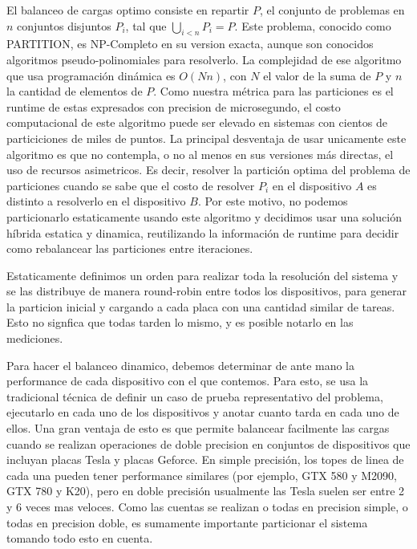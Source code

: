 El balanceo de cargas optimo consiste en repartir $P$, el conjunto de problemas en
$n$ conjuntos disjuntos $P_i$, tal que $\bigcup_{i<n} P_i = P$. Este problema, conocido como PARTITION,
es NP-Completo en su version exacta, aunque son conocidos algoritmos pseudo-polinomiales para resolverlo.
La complejidad de ese algoritmo que usa programaci\'on din\'amica es $O(Nn)$, con $N$ el valor
de la suma de $P$ y $n$ la cantidad de elementos de $P$. Como nuestra m\'etrica para las
particiones es el runtime de estas expresados con precision de microsegundo, el costo computacional
de este algoritmo puede ser elevado en sistemas con cientos de particiciones de miles de puntos.
La principal desventaja de usar unicamente este algoritmo es que no contempla, o no al menos
en sus versiones m\'as directas, el uso de recursos asimetricos. Es decir, resolver la partici\'on
optima del problema de particiones cuando se sabe que el costo de resolver $P_i$ en el dispositivo
$A$ es distinto a resolverlo en el dispositivo $B$. Por este motivo, no podemos particionarlo estaticamente
usando este algoritmo y decidimos usar una soluci\'on h\'ibrida estatica y dinamica, reutilizando
la informaci\'on de runtime para decidir como rebalancear las particiones entre iteraciones.

Estaticamente definimos un orden para realizar toda la resoluci\'on del sistema y
se las distribuye de manera round-robin entre todos los dispositivos, para generar la
particion inicial y cargando a cada placa con una cantidad similar de tareas. Esto no signfica
que todas tarden lo mismo, y es posible notarlo en las mediciones.

Para hacer el balanceo dinamico, debemos determinar de ante mano la performance de cada
dispositivo con el que contemos. Para esto, se usa la tradicional t\'ecnica de definir un
caso de prueba representativo del problema, ejecutarlo en cada uno de los dispositivos y anotar
cuanto tarda en cada uno de ellos. Una gran ventaja de esto es que permite balancear facilmente las
cargas cuando se realizan operaciones de doble precision en conjuntos de dispositivos que incluyan
placas Tesla y placas Geforce. En simple precisi\'on, los topes de linea de cada una pueden tener
performance similares (por ejemplo, GTX 580 y M2090, GTX 780 y K20), pero en doble precisi\'on
usualmente las Tesla suelen ser entre 2 y 6 veces mas veloces. Como las cuentas se realizan
o todas en precision simple, o todas en precision doble, es sumamente importante particionar el
sistema tomando todo esto en cuenta.

